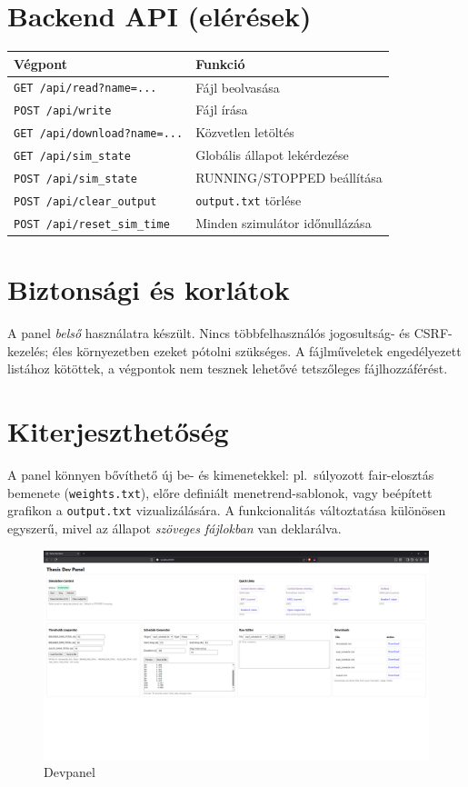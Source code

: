\section{Backend API (elérések)}
\begin{center}
\begin{tabular}{ll}
\hline
\textbf{Végpont} & \textbf{Funkció} \\
\hline
\texttt{GET\ /api/read?name=...} & Fájl beolvasása \\
\texttt{POST\ /api/write} & Fájl írása \\
\texttt{GET\ /api/download?name=...} & Közvetlen letöltés \\
\texttt{GET\ /api/sim\_state} & Globális állapot lekérdezése \\
\texttt{POST\ /api/sim\_state} & RUNNING/STOPPED beállítása \\
\texttt{POST\ /api/clear\_output} & \texttt{output.txt} törlése \\
\texttt{POST\ /api/reset\_sim\_time} & Minden szimulátor időnullázása \\
\hline
\end{tabular}
\end{center}

\section{Biztonsági és korlátok}
A panel \emph{belső} használatra készült. Nincs többfelhasználós jogosultság- és CSRF-kezelés; 
éles környezetben ezeket pótolni szükséges. A fájlműveletek engedélyezett listához kötöttek, 
a végpontok nem tesznek lehetővé tetszőleges fájlhozzáférést.

\section{Kiterjeszthetőség}
A panel könnyen bővíthető új be- és kimenetekkel: pl.\ súlyozott fair-elosztás bemenete (\texttt{weights.txt}), 
előre definiált menetrend-sablonok, vagy beépített grafikon a \texttt{output.txt} vizualizálására. 
A funkcionalitás változtatása különösen egyszerű, mivel az állapot \emph{szöveges fájlokban} 
van deklarálva.

\begin{figure}
    \centering
    \includegraphics[width=1\textwidth]{figures/devpanel.png}
    \caption{Devpanel}
    \label{fig:devpanel}
\end{figure}